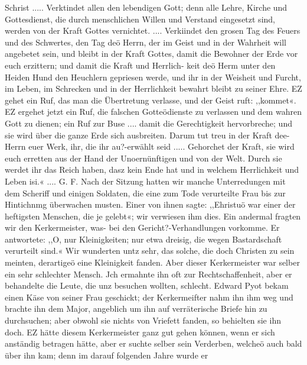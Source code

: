 Schrist ..... Verktindet allen den lebendigen Gott; denn alle
Lehre, Kirche und Gottesdienst, die durch menschlichen Willen und
Verstand eingesetzt sind, werden von der Kraft Gottes vernichtet.
.... Verkiindet den grosen Tag des Feuers und des Schwertes,
den Tag deö Herrn, der im Geist und in der Wahrheit will
angebetet sein, und bleibt in der Kraft Gottes, damit die Bewohner
der Erde vor euch erzittern; und damit die Kraft und Herrlich-
keit deö Herm unter den Heiden Hund den Heuchlern gepriesen
werde, und ihr in der Weisheit und Furcht, im Leben, im Schrecken
und in der Herrlichkeit bewahrt bleibt zu seiner Ehre. EZ gehet
ein Ruf, das man die Übertretung verlasse, und der Geist ruft:
,,kommet«. EZ ergehet jetzt ein Ruf, die falschen Gotteödienste
zu verlassen und dem wahren Gott zu dienen; ein Ruf zur
Buse .... damit die Gerechtigkeit hervorbreche; und sie wird
über die ganze Erde sich ausbreiten. Darum tut treu in der
Kraft dee- Herrn euer Werk, ihr, die ihr au?-erwählt seid .....
Gehorchet der Kraft, sie wird euch erretten aus der Hand der
Unoernünftigen und von der Welt. Durch sie werdet ihr das
Reich haben, dasz kein Ende hat und in welchem Herrlichkeit und
Leben isi.« .... G. F.
Nach der Sitzung hatten wir manche Unterredungen mit dem
Scheriff und einigen Soldaten, die eine zum Tode verurteilte Frau
bis zur Hintichnmg überwachen musten. Einer von ihnen sagte:
,,Ehristuö war einer der heftigsten Menschen, die je gelebt«; wir
verwiesen ihm dies. Ein andermal fragten wir den Kerkermeister,
was- bei den Gericht?-Verhandlungen vorkomme. Er antwortete:
,,O, nur Kleinigkeiten; nur etwa dreisig, die wegen Bastardschaft
verurteilt sind.« Wir wunderten untz sehr, das solche, die doch
Christen zu sein meinten, derartigeö eine Kleinigkeit fanden.
Aber dieser Kerkermeister war selber ein sehr schlechter Mensch.
Jch ermahnte ihn oft zur Rechtschaffenheit, aber er behandelte
die Leute, die unz besuchen wollten, schlecht. Edward Pyot bekam
einen Käse von seiner Frau geschickt; der Kerkermeifter nahm ihn
ihm weg und brachte ihn dem Major, angeblich um ihn auf
verräterische Briefe hin zu durchsuchen; aber obwohl sie nichts
von Vriefett fanden, so behielten sie ihn doch. EZ hätte diesem
Kerkermeister ganz gut gehen können, wenn er sich anständig
betragen hätte, aber er suchte selber sein Verderben, welcheö auch
bald über ihn kam; denn im darauf folgenden Jahre wurde er


